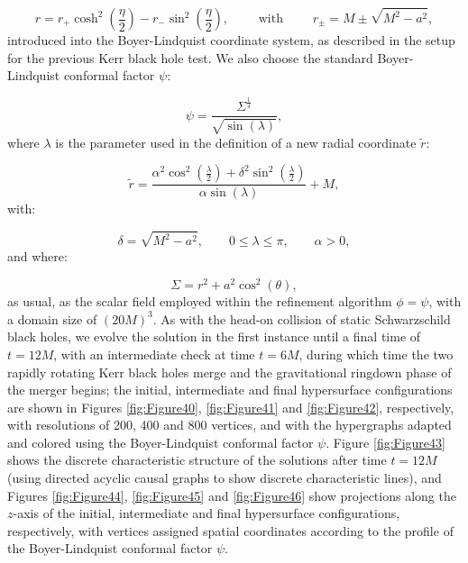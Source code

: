 \documentclass{article}
\begin{document}
\begin{equation}
r = r_{+} \cosh^2 \left( \frac{\eta}{2} \right) - r_{-} \sin^2 \left( \frac{\eta}{2} \right), \qquad \text{ with } \qquad r_{\pm} = M \pm \sqrt{M^2 - a^2},
\end{equation}
introduced into the Boyer-Lindquist coordinate system, as described in the setup for the previous Kerr black hole test. We also choose the standard Boyer-Lindquist conformal factor ${\psi}$:

\begin{equation}
\psi = \frac{\Sigma^{\frac{1}{4}}}{\sqrt{\sin \left( \lambda \right)}},
\end{equation}
where ${\lambda}$ is the parameter used in the definition of a new radial coordinate ${\tilde{r}}$:

\begin{equation}
\tilde{r} = \frac{\alpha^2 \cos^2 \left( \frac{\lambda}{2} \right) + \delta^2 \sin^2 \left( \frac{\lambda}{2} \right)}{\alpha \sin \left( \lambda \right)} + M,
\end{equation}
with:

\begin{equation}
\delta = \sqrt{M^2 - a^2}, \qquad 0 \leq \lambda \leq \pi, \qquad \alpha > 0,
\end{equation}
and where:

\begin{equation}
\Sigma = r^2 + a^2 \cos^2 \left( \theta \right),
\end{equation}
as usual, as the scalar field employed within the refinement algorithm ${\phi = \psi}$, with a domain size of ${\left( 20 M \right)^3}$. As with the head-on collision of static Schwarzschild black holes, we evolve the solution in the first instance until a final time of ${t = 12 M}$, with an intermediate check at time ${t = 6 M}$, during which time the two rapidly rotating Kerr black holes merge and the gravitational ringdown phase of the merger begins; the initial, intermediate and final hypersurface configurations are shown in Figures \ref{fig:Figure40}, \ref{fig:Figure41} and \ref{fig:Figure42}, respectively, with resolutions of 200, 400 and 800 vertices, and with the hypergraphs adapted and colored using the Boyer-Lindquist conformal factor ${\psi}$. Figure \ref{fig:Figure43} shows the discrete characteristic structure of the solutions after time ${t = 12 M}$ (using directed acyclic causal graphs to show discrete characteristic lines), and Figures \ref{fig:Figure44}, \ref{fig:Figure45} and \ref{fig:Figure46} show projections along the $z$-axis of the initial, intermediate and final hypersurface configurations, respectively, with vertices assigned spatial coordinates according to the profile of the Boyer-Lindquist conformal factor ${\psi}$.
\end{document}
